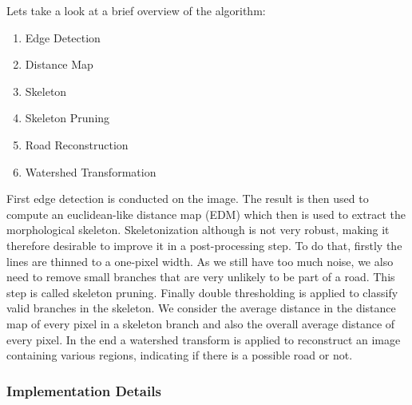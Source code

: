 \documentclass[10pt,conference,compsocconf]{IEEEtran}
\begin{document}
Lets take a look at a brief overview of the algorithm:
\begin{enumerate}
	\item Edge Detection
	\item Distance Map
	\item Skeleton
	\item Skeleton Pruning
	\item Road Reconstruction
	\item Watershed Transformation
\end{enumerate}
First edge detection is conducted on the image. The result is then used to compute an euclidean-like distance map (EDM) which then is used to extract the morphological skeleton. Skeletonization although is not very robust, making it therefore desirable to improve it in a post-processing step. To do that, firstly the lines are thinned to a one-pixel width. As we still have too much noise, we also need to remove small branches that are very unlikely to be part of a road. This step is called skeleton pruning. Finally double thresholding is applied to classify valid branches in the skeleton. We consider the average distance in the distance map of every pixel in a skeleton branch and also the overall average distance of every pixel. In the end a watershed transform is applied to reconstruct an image containing various regions, indicating if there is a possible road or not.

\subsubsection{Implementation Details} \hspace*{\fill}
\end{document}
